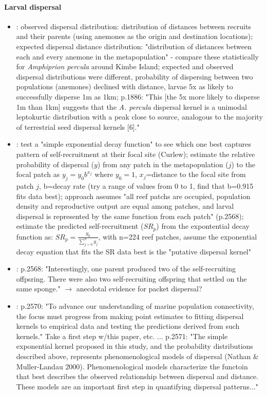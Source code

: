 \documentclass[12pt, oneside]{article}   	%
\begin{document}
\paragraph*{Larval dispersal}
\begin{itemize}
\item \cite{buston2011probability}: observed dispersal distribution: distribution of distances between recruits and their parents (using anemones as the origin and destination locations); expected dispersal distance distribution: "distribution of distances between each and every anemone in the metapopulation" - compare these statistically for \textit{Amphiprion percula} around Kimbe Island; expected and observed dispersal distributions were different, probability of dispersing between two populations (anemones) declined with distance, larvae 5x as likely to successfully disperse 1m as 1km; p.1886: "This [the 5x more likely to disperse 1m than 1km] suggests that the \textit{A. percula} dispersal kernel is a unimodal leptokurtic distribution with a peak close to source, analogous to the majority of terrestrial seed dispersal kernels [6]."
\item \cite{daloia_self-recruitment_2013}: test a "simple exponential decay function" to see which one best captures pattern of self-recruitment at their focal site (Curlew); estimate the relative probability of dispersal ($y$) from any patch in the metapopulation ($j$) to the focal patch as $y_j = y_0b^{x_j}$ where $y_0=1$, $x_j$=distance to the focal site from patch $j$, b=decay rate (try a range of values from 0 to 1, find that b=0.915 fits data best); approach assumes "all reef patchs are occupied, population density and reproductive output are equal among patches, and larval dispersal is represented by the same function from each patch" (p.2568); estimate the predicted self-recruitment ($SR_p$) from the expontential decay function as: $SR_p = \frac{y_0}{\sum_{j=0}^{n} y_j}$, with n=224 reef patches, assume the exponential decay equation that fits the SR data best is the "putative dispersal kernel"
\item \cite{daloia_self-recruitment_2013}: p.2568: "Interestingly, one parent produced two of the self-recruiting offpsring. There were also two self-recruiting offspring that settled on the same sponge." $\rightarrow$ anecdotal evidence for packet dispersal?
\item \cite{daloia_self-recruitment_2013}: p.2570: "To advance our understanding of marine population connectivity, the focus must progress from making point estimates to fitting dispersal kernels to empirical data and testing the predictions derived from such kernels." Take a first step w/this paper, etc. ... p.2571: "The simple exponential kernel proposed in this study, and the probability distributions described above, represents phenomenological models of dispersal (Nathan \& Muller-Landau 2000). Phenomenological models characterize the functoin that best describes the observed relationship between dispersal and distance. These models are an important first step in quantifying dispersal patterns..."

\end{itemize}
\end{document}
